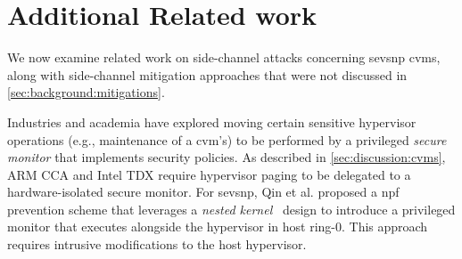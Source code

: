 \section{Additional Related work}
We now examine related work on side-channel attacks concerning \gls{sevsnp} \glspl{cvm}, along with side-channel mitigation approaches that were not discussed in
\cref{sec:background:mitigations}.












\iffalse
	Industries and academia have explored moving certain sensitive hypervisor operations (e.g., maintenance of a \gls{cvm}'s) to be performed by a privileged \emph{secure monitor} that implements security policies.
	As described in \cref{sec:discussion:cvms}, ARM CCA and Intel TDX require hypervisor paging to be delegated to a hardware-isolated secure monitor.
	For  \gls{sevsnp}, Qin et al. \cite{qin2020understanding} proposed a \gls{npf} prevention scheme that leverages a \emph{nested kernel}~\cite{dautenhahn2015nested} design to introduce a privileged monitor that executes alongside the hypervisor in host ring-0.
	This approach requires intrusive modifications to the host hypervisor.

